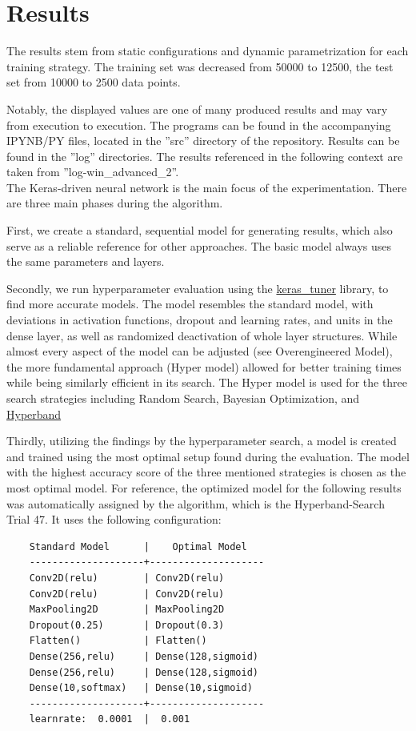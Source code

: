\chapter{Results}
The results stem from static configurations and dynamic parametrization for each training strategy.
The training set was decreased from 50000 to 12500, the test set from 10000 to 2500 data points.

Notably, the displayed values are one of many produced results and may vary from execution to execution. The programs can be found in the accompanying IPYNB/PY files, located in the ''src'' directory of the repository.
Results can be found in the ''log'' directories. The results referenced in the following context are taken from ''log-win\_advanced\_2''.\\

The Keras-driven neural network is the main focus of the experimentation. There are three main phases during the algorithm.

First, we create a standard, sequential model for generating results, which also serve as a 
reliable reference for other approaches. The basic model always uses the same parameters and layers.

Secondly, we run hyperparameter evaluation using the \href{https://keras.io/keras_tuner/}{keras\_tuner} library, to find more accurate models. The model resembles the standard model, with deviations in activation functions, dropout and learning rates, and units in the dense layer, as well as randomized deactivation of whole layer structures.
While almost every aspect of the model can be adjusted (see Overengineered Model), the more fundamental approach (Hyper model) allowed for better training times while being similarly efficient in its search.
The Hyper model is used for the three search strategies including Random Search, Bayesian Optimization, and \href{https://arxiv.org/abs/1603.06560}{Hyperband}

Thirdly, utilizing the findings by the hyperparameter search, a model is created and trained using the most optimal setup found during the evaluation.
The model with the highest accuracy score of the three mentioned strategies is chosen as the most optimal model.
For reference, the optimized model for the following results was automatically assigned by the algorithm, which is the Hyperband-Search Trial 47.
It uses the following configuration:
\begin{center}
  \begin{verbatim}
    Standard Model      |    Optimal Model
    --------------------+--------------------
    Conv2D(relu)        | Conv2D(relu)
    Conv2D(relu)        | Conv2D(relu)
    MaxPooling2D        | MaxPooling2D
    Dropout(0.25)       | Dropout(0.3)
    Flatten()           | Flatten()
    Dense(256,relu)     | Dense(128,sigmoid)
    Dense(256,relu)     | Dense(128,sigmoid)
    Dense(10,softmax)   | Dense(10,sigmoid)
    --------------------+--------------------
    learnrate:  0.0001  |  0.001   
  \end{verbatim}
\end{center}

